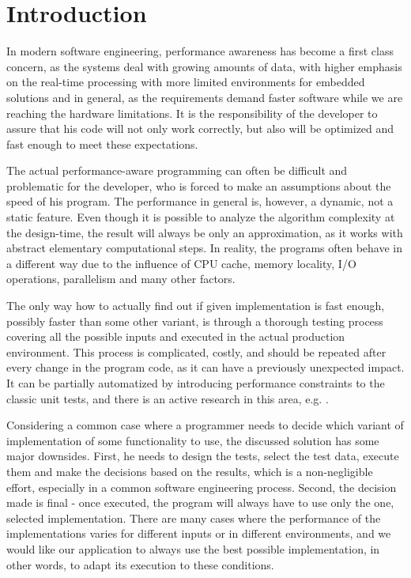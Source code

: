 \chapter*{Introduction}

In modern software engineering, performance awareness has become a first class concern, as the systems deal with growing amounts of data, with higher emphasis on the real-time processing with more limited environments for embedded solutions and in general, as the requirements demand faster software while we are reaching the hardware limitations. It is the responsibility of the developer to assure that his code will not only work correctly, but also will be optimized and fast enough to meet these expectations.

The actual performance-aware programming can often be difficult and problematic for the developer, who is forced to make an assumptions about the speed of his program. The performance in general is, however, a dynamic, not a static feature. Even though it is possible to analyze the algorithm complexity at the design-time, the result will always be only an approximation, as it works with abstract elementary computational steps. In reality, the programs often behave in a different way due to the influence of CPU cache, memory locality, I/O operations, parallelism and many other factors. 

The only way how to actually find out if given implementation is fast enough, possibly faster than some other variant, is through a thorough testing process covering all the possible inputs and executed in the actual production environment. This process is complicated, costly, and should be repeated after every change in the program code, as it can have a previously unexpected impact. It can be partially automatized by introducing performance constraints to the classic unit tests, and there is an active research in this area, e.g. \cite{bulej_capturing_2012,horky_performance_2013,horky_utilizing_2015}.

Considering a common case where a programmer needs to decide which variant of implementation of some functionality to use, the discussed solution has some major downsides. First, he needs to design the tests, select the test data, execute them and make the decisions based on the results, which is a non-negligible effort, especially in a common software engineering process. Second, the decision made is final - once executed, the program will always have to use only the one, selected implementation. There are many cases where the performance of the implementations varies for different inputs or in different environments, and we would like our application to always use the best possible implementation, in other words, to adapt its execution to these conditions.

